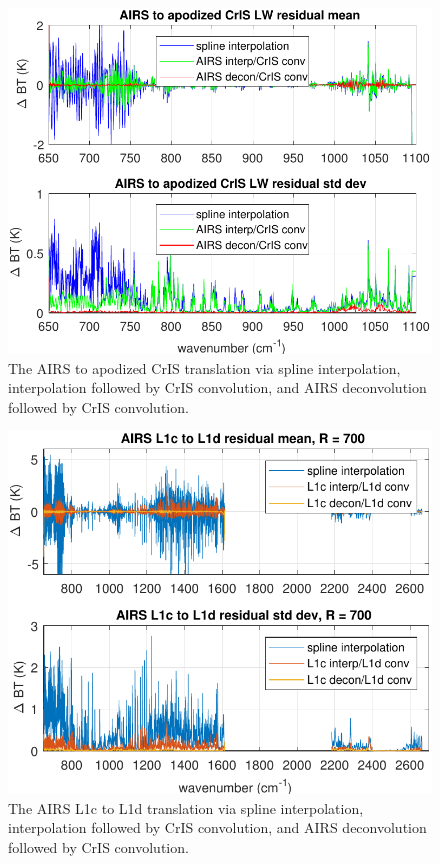 \documentclass[journal]{IEEEtran}
\begin{document}
\begin{figure} %
  \centering
  \includegraphics[width=\linewidth]{figures/a2cris_interp_LW.pdf}
  \caption{The AIRS to apodized CrIS translation via spline
    interpolation, interpolation followed by CrIS convolution, and AIRS
    deconvolution followed by CrIS convolution.}
  \label{intpLW}
\end{figure}

\begin{figure} %
  \centering
  \includegraphics[width=\linewidth]{figures/CtoD_interp_diff.pdf}
  \caption{The AIRS L1c to L1d translation via spline interpolation,
    interpolation followed by CrIS convolution, and AIRS
    deconvolution followed by CrIS convolution.}
  \label{interpL1d}
\end{figure}
\end{document}
